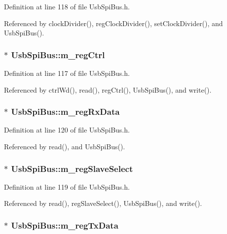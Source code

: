 Definition at line 118 of file UsbSpiBus.h.

Referenced by clockDivider(), regClockDivider(), setClockDivider(), and UsbSpiBus().\hypertarget{classUsbSpiBus_abcd2ac59f2bb4ea5b97ff98f2b7659da}{
\subsubsection[{m\_\-regCtrl}]{$\ast$ {\bf UsbSpiBus::m\_\-regCtrl}}}
\label{classUsbSpiBus_abcd2ac59f2bb4ea5b97ff98f2b7659da}


Definition at line 117 of file UsbSpiBus.h.

Referenced by ctrlWd(), read(), regCtrl(), UsbSpiBus(), and write().\hypertarget{classUsbSpiBus_ab59fb8ae67f97818d8cc6e0daf324cf6}{
\subsubsection[{m\_\-regRxData}]{$\ast$ {\bf UsbSpiBus::m\_\-regRxData}}}
\label{classUsbSpiBus_ab59fb8ae67f97818d8cc6e0daf324cf6}


Definition at line 120 of file UsbSpiBus.h.

Referenced by read(), and UsbSpiBus().\hypertarget{classUsbSpiBus_a5cdebdc06a79322c0802fbc523cade91}{
\subsubsection[{m\_\-regSlaveSelect}]{$\ast$ {\bf UsbSpiBus::m\_\-regSlaveSelect}}}
\label{classUsbSpiBus_a5cdebdc06a79322c0802fbc523cade91}


Definition at line 119 of file UsbSpiBus.h.

Referenced by read(), regSlaveSelect(), UsbSpiBus(), and write().\hypertarget{classUsbSpiBus_ae4b9ec4d035b9a507735b28dba04556c}{
\subsubsection[{m\_\-regTxData}]{$\ast$ {\bf UsbSpiBus::m\_\-regTxData}}}
\label{classUsbSpiBus_ae4b9ec4d035b9a507735b28dba04556c}


